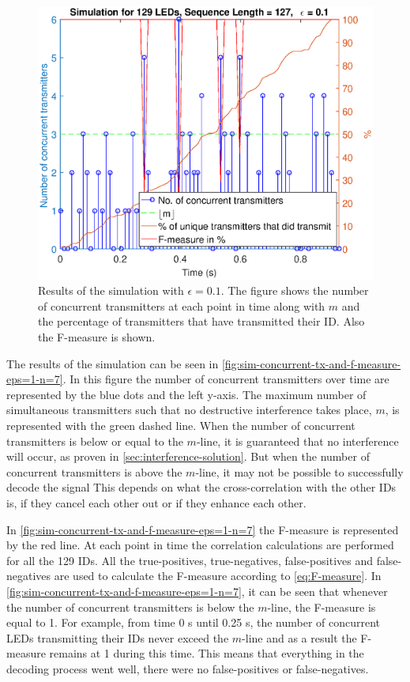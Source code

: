 \begin{figure}[ht]
	\centering
	\includegraphics[width=\textwidth]{chapters/evaluation-chapters/simulation/sim-concurrent-tx-and-f-measure-eps=1-n=7.eps}
	\caption{Results of the simulation with $\epsilon = 0.1$. The figure shows the number of concurrent transmitters at each point in time along with $m$ and the percentage of transmitters that have transmitted their ID. Also the F-measure is shown.}
	\label{fig:sim-concurrent-tx-and-f-measure-eps=1-n=7}
\end{figure}



The results of the simulation can be seen in \autoref{fig:sim-concurrent-tx-and-f-measure-eps=1-n=7}.
In this figure the number of concurrent transmitters over time are represented by the blue dots and the left y-axis.
The maximum number of simultaneous transmitters such that no destructive interference takes place, $m$, is represented with the green dashed line.
When the number of concurrent transmitters is below or equal to the $m$-line, it is guaranteed that no interference will occur, as proven in \autoref{sec:interference-solution}.
But when the number of concurrent transmitters is above the $m$-line, it may not be possible to successfully decode the signal
This depends on what the cross-correlation with the other IDs is, if they cancel each other out or if they enhance each other.

In \autoref{fig:sim-concurrent-tx-and-f-measure-eps=1-n=7} the F-measure is represented by the red line.
At each point in time the correlation calculations are performed for all the 129 IDs.
All the true-positives, true-negatives, false-positives and false-negatives are used to calculate the F-measure according to \autoref{eq:F-measure}.
In \autoref{fig:sim-concurrent-tx-and-f-measure-eps=1-n=7}, it can be seen that whenever the number of concurrent transmitters is below the $m$-line, the F-measure is equal to 1.
For example, from time 0 s until 0.25 s, the number of concurrent LEDs transmitting their IDs never exceed the $m$-line and as a result the F-measure remains at 1 during this time.
This means that everything in the decoding process went well, there were no false-positives or false-negatives.

